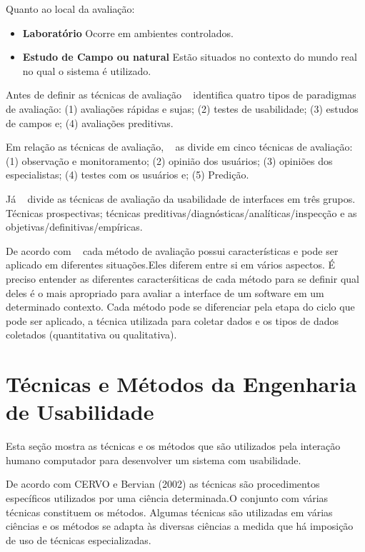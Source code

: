 	Quanto ao local da avaliação:

	\begin{itemize}
		\item \textbf{Laboratório} Ocorre em ambientes controlados.
		\item \textbf{Estudo de Campo ou natural} Estão situados no contexto do mundo real no qual o sistema é utilizado.
	\end{itemize}

	 
	Antes de definir as técnicas de avaliação ~ identifica quatro tipos de paradigmas de avaliação: (1) avaliações rápidas e sujas; (2) testes de usabilidade; (3) estudos de campos e; (4) avaliações preditivas.

	Em relação as técnicas de avaliação, ~ as divide em cinco técnicas de avaliação: (1) observação e monitoramento; (2) opinião dos usuários; (3) opiniões dos especialistas; (4) testes com os usuários e; (5) Predição. 

	Já ~ divide as técnicas de avaliação da usabilidade de interfaces em três grupos. Técnicas prospectivas; técnicas preditivas/diagnósticas/analíticas/inspecção e as objetivas/definitivas/empíricas.

	De acordo com ~ cada método de avaliação possui características e pode ser aplicado em diferentes situações.Eles diferem entre si em vários aspectos. É preciso entender as diferentes caracterśiticas de cada método para se definir qual deles é o mais apropriado para avaliar a interface de um software em um determinado contexto. Cada método pode se diferenciar pela etapa do ciclo que pode ser aplicado, a técnica utilizada para coletar dados e os tipos de dados coletados (quantitativa ou qualitativa).


\section{Técnicas e Métodos da Engenharia de Usabilidade}

	Esta seção mostra as técnicas e os métodos que são utilizados pela interação humano computador para desenvolver um sistema com usabilidade.

	De acordo com CERVO e Bervian (2002) as técnicas são procedimentos específicos utilizados por uma ciência determinada.O conjunto com várias técnicas constituem os métodos. Algumas técnicas são utilizadas em várias ciências e os métodos se adapta às diversas ciências a medida que há imposição de uso de técnicas especializadas.

